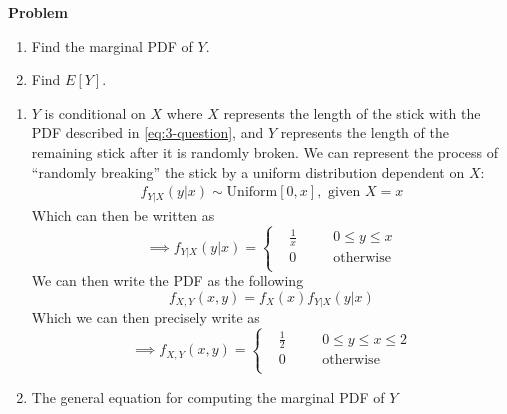 \documentclass[12pt]{article}
\newenvironment{Ex}{\textbf{Problem}\vspace{.75em}\\}{}
\begin{document}
\begin{enumerate}
\begin{Ex}
\begin{enumerate}
    \item Find the marginal PDF of $Y$.
    \item Find $E[Y]$.
    \end{enumerate}
    \begin{solution} \hfill
      \begin{enumerate}
      \item $Y$ is conditional on $X$ where $X$ represents the length
        of the stick with the PDF described in \cref{eq:3-question},
        and $Y$ represents the length of the remaining stick after it
        is randomly broken. We can represent the process of ``randomly
        breaking'' the stick by a uniform distribution dependent on
        $X$:
        \begin{equation}
          \label{eq:3a-y-given-x-dist}
          \begin{aligned}
            f_{Y|X}(y|x) \sim \text{Uniform}[0,x], \text{ given } X = x
          \end{aligned}
        \end{equation}
        Which can then be written as
        \begin{equation}
          \label{eq:3a-y-given-x-pdf}
          \implies f_{Y|X}(y|x) = \left\{
            \begin{aligned}
              & \frac{1}{x} &&\quad 0 \le y \le x \\
              & 0 &&\quad \text{otherwise} \\
            \end{aligned} \right.
        \end{equation}
        We can then write the PDF as the following
        \begin{equation}
          \label{eq:3a-presol}
            f_{X,Y}(x,y) = f_X(x)f_{Y|X}(y|x)
        \end{equation}
        Which we can then precisely write as
        \begin{equation}
          \label{eq:3a-sol}
          \implies f_{X,Y}(x,y) = \left\{
            \begin{aligned}
              & \frac{1}{2} && \quad 0 \le y \le x \le 2 \\
              & 0 &&\quad\text{otherwise} \\
            \end{aligned} \right.
        \end{equation}
      \item The general equation for computing the marginal PDF of $Y$

\end{enumerate}
\end{solution}
\end{Ex}
\end{enumerate}
\end{document}
